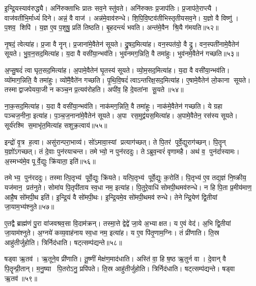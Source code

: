 इ॒न्द्रि॒यस्याव॑रुद्ध्यै।
अनि॑रुक्ताभिः प्रातः सव॒ने स्तु॑वते।
अनि॑रुक्तः प्र॒जाप॑तिः।
प्र॒जाप॑ते॒राप्त्यै।
वाज॑वतीभि॒र्माध्यं॑ दिने।
अन्नं॒ वै वाज॑।
अन्न॑मे॒वाव॑रुन्धे।
शि॒पि॒वि॒ष्ट\-व॑तीभिस्तृतीयसव॒ने।
य॒ज्ञो वै विष्णु॑।
प॒शव॒ शिपि॑।
य॒ज्ञ ए॒व प॒शुषु॒ प्रति॑ तिष्ठति।
बृ॒हदन्त्यं॑ भवति।
अन्त॑मे॒वैन श्रि॒यै ग॑मयति॥५२॥\anuvakamend[अ॒श्नी॒यादन्न॑स्यान्न॒स्याव॑रुद्ध्या॒ इन्द्र॑स्य त्वा॒ साम्राज्येना॒भिषि॑ञ्चा॒मीत्या॑ह वाज॒सृत॒ शिपि॒स्त्रीणि॑ च]

नृ॒षदं॒ त्वेत्या॑ह।
प्र॒जा वै नॄन्।
प्र॒जाना॑मे॒वैतेन॑ सूयते।
द्रु॒षद॒मित्या॑ह।
वन॒स्पत॑यो॒ वै द्रु।
वन॒स्पती॑नामे॒वैतेन॑ सूयते।
भु॒व॒न॒सद॒मित्या॑ह।
य॒दा वै वसी॑या॒न्भव॑ति।
भुव॑नमग॒न्निति॒ वै तमा॑हुः।
भुव॑नमे॒वैतेन॑ गच्छति॥५३॥

अ॒प्सु॒षदं॑ त्वा घृत॒सद॒मित्या॑ह।
अ॒पामे॒वैतेन॑ घृ॒तस्य॑ सूयते।
व्यो॒म॒सद॒मित्या॑ह।
य॒दा वै वसी॑या॒न्भव॑ति।
व्यो॑माग॒न्निति॒ वै तमा॑हुः।
व्यो॑मै॒वैते॑न गच्छति।
पृ॒थि॒वि॒षदं॑ त्वाऽन्तरिक्ष॒सद॒मित्या॑ह।
ए॒षामे॒वैतेन॑ लो॒काना सूयते।
तस्माद्वाजपेयया॒जी न कञ्च॒न प्र॒त्यव॑रोहति।
अपी॑व॒ हि दे॒वता॑ना सू॒यते॥५४॥

ना॒क॒सद॒मित्या॑ह।
य॒दा वै वसी॑या॒न्भव॑ति।
नाक॑मग॒न्निति॒ वै तमा॑हुः।
नाक॑मे॒वैतेन॑ गच्छति।
ये ग्रहा पञ्चज॒नीना॒ इत्या॑ह।
प॒ञ्च॒ज॒नाना॑मे॒वैतेन॑ सूयते।
अ॒पा रस॒मुद्व॑यस॒मित्या॑ह।
अ॒पामे॒वैतेन॒ रस॑स्य सूयते।
सूर्य॑रश्मि स॒माभृ॑त॒मित्या॑ह सशुक्र॒त्वाय॑॥५५॥\anuvakamend[ग॒च्छ॒ति॒ सू॒यते॒ नव॑ च]

इन्द्रो॑ वृ॒त्र ह॒त्वा।
असु॑रान्परा॒भाव्य॑।
सो॑ऽमावा॒स्यां प्रत्याग॑च्छत्।
ते पि॒तर॑ पूर्वे॒द्युराग॑च्छन्।
पि॒तॄन् य॒ज्ञो॑ऽगच्छत्।
तं दे॒वाः पुन॑रयाचन्त।
तमेभ्यो॒ न पुन॑रददुः।
तेऽब्रुव॒न्वरं॑ वृणामहै।
अथ॑ व॒ पुन॑र्दास्यामः।
अ॒स्मभ्य॑मे॒व पूर्वे॒द्युः क्रि॑याता॒ इति॑॥५६॥

तमेभ्य॒ पुन॑रददुः।
तस्मात्पि॒तृभ्य॑ पूर्वे॒द्युः क्रि॑यते।
यत्पि॒तृभ्य॑ पूर्वे॒द्युः क॒रोति॑।
पि॒तृभ्य॑ ए॒व तद्य॒ज्ञं नि॒ष्क्रीय॒ यज॑मान॒ प्रत॑नुते।
सोमा॑य पि॒तृपी॑ताय स्व॒धा नम॒ इत्या॑ह।
पि॒तुरे॒वाधि॑ सोमपी॒थमव॑रुन्धे।
न हि पि॒ता प्र॒मीय॑माण॒ आहै॒ष सो॑मपी॒थ इति॑।
इ॒न्द्रि॒यं वै सो॑मपी॒थः।
इ॒न्द्रि॒यमे॒व सो॑मपी॒थमव॑ रुन्धे।
तेनेन्द्रि॒येण॑ द्वि॒तीयां जा॒याम॒भ्य॑श्नुते॥५७॥

ए॒तद्वै ब्राह्म॑णं पु॒रा वा॑जवश्रव॒सा वि॒दाम॑क्रन्।
तस्मा॒त्ते द्वेद्वे॑ जा॒ये अ॒भ्याक्षत।
य ए॒वं वेद॑।
अ॒भि द्वि॒तीयां जा॒याम॑श्नुते।
अ॒ग्नये॑ कव्य॒वाह॑नाय स्व॒धा नम॒ इत्या॑ह।
य ए॒व पि॑तृ॒णाम॒ग्निः।
तं प्री॑णाति।
ति॒स्र आहु॑तीर्जुहोति।
त्रिर्निद॑धाति।
षट्त्सम्प॑द्यन्ते॥५८॥

षड्वा ऋ॒तव॑।
ऋ॒तूने॒व प्री॑णाति।
तू॒ष्णीं मेक्ष॑ण॒माद॑धाति।
अस्ति॑ वा॒ हि ष॒ष्ठ ऋ॒तुर्न वा।
दे॒वान् वै पि॒तॄन्प्री॒तान्।
म॒नु॒ष्या पि॒तरोऽनु॒ प्रपि॑पते।
ति॒स्र आहु॑तीर्जुहोति।
त्रिर्निद॑धाति।
षट्त्सम्प॑द्यन्ते।
षड्वा ऋ॒तव॑॥५९॥

